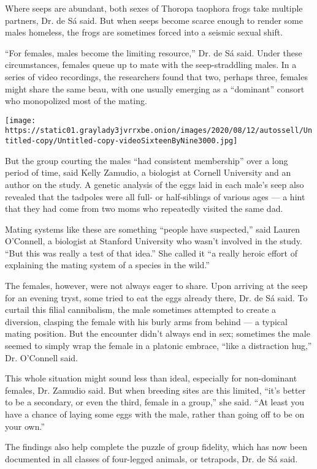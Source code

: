 Where seeps are abundant, both sexes of Thoropa taophora frogs take
multiple partners, Dr. de Sá said. But when seeps become scarce enough
to render some males homeless, the frogs are sometimes forced into a
seismic sexual shift.

``For females, males become the limiting resource,'' Dr. de Sá said.
Under these circumstances, females queue up to mate with the
seep-straddling males. In a series of video recordings, the researchers
found that two, perhaps three, females might share the same beau, with
one usually emerging as a ``dominant'' consort who monopolized most of
the mating.

\texttt{[image: https://static01.graylady3jvrrxbe.onion/images/2020/08/12/autossell/Untitled-copy/Untitled-copy-videoSixteenByNine3000.jpg]}

But the group courting the males ``had consistent membership'' over a
long period of time, said Kelly Zamudio, a biologist at Cornell
University and an author on the study. A genetic analysis of the eggs
laid in each male's seep also revealed that the tadpoles were all full-
or half-siblings of various ages --- a hint that they had come from two
moms who repeatedly visited the same dad.

Mating systems like these are something ``people have suspected,'' said
Lauren O'Connell, a biologist at Stanford University who wasn't involved
in the study. ``But this was really a test of that idea.'' She called it
``a really heroic effort of explaining the mating system of a species in
the wild.''

The females, however, were not always eager to share. Upon arriving at
the seep for an evening tryst, some tried to eat the eggs already there,
Dr. de Sá said. To curtail this filial cannibalism, the male sometimes
attempted to create a diversion, clasping the female with his burly arms
from behind --- a typical mating position. But the encounter didn't
always end in sex; sometimes the male seemed to simply wrap the female
in a platonic embrace, ``like a distraction hug,'' Dr. O'Connell said.

This whole situation might sound less than ideal, especially for
non-dominant females, Dr. Zamudio said. But when breeding sites are this
limited, ``it's better to be a secondary, or even the third, female in a
group,'' she said. ``At least you have a chance of laying some eggs with
the male, rather than going off to be on your own.''

The findings also help complete the puzzle of group fidelity, which has
now been documented in all classes of four-legged animals, or tetrapods,
Dr. de Sá said.

